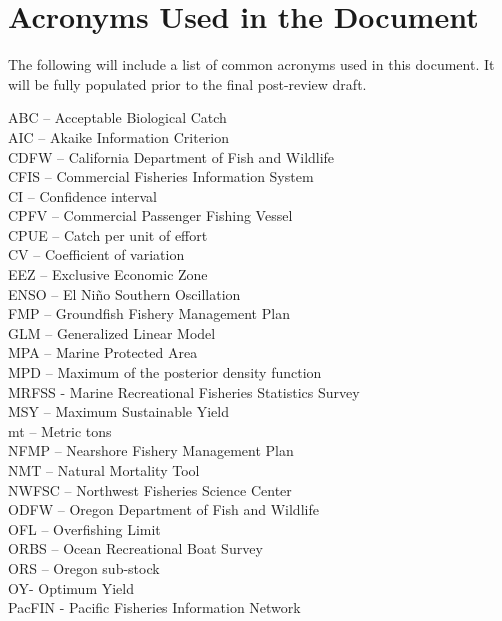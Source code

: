 \documentclass[11pt,
  english,
  letterpaper,
]{article}
\begin{document}
\newpage

\hypertarget{acronyms-used-in-the-document}{%
\section*{Acronyms Used in the Document}\label{acronyms-used-in-the-document}}

The following will include a list of common acronyms used in this document. It will be fully populated prior to the final post-review draft.

ABC -- Acceptable Biological Catch\\
AIC -- Akaike Information Criterion\\
CDFW -- California Department of Fish and Wildlife\\
CFIS -- Commercial Fisheries Information System\\
CI -- Confidence interval\\
CPFV -- Commercial Passenger Fishing Vessel\\
CPUE -- Catch per unit of effort\\
CV -- Coefficient of variation\\
EEZ -- Exclusive Economic Zone\\
ENSO -- El Niño Southern Oscillation\\
FMP -- Groundfish Fishery Management Plan\\
GLM -- Generalized Linear Model\\
MPA -- Marine Protected Area\\
MPD -- Maximum of the posterior density function\\
MRFSS - Marine Recreational Fisheries Statistics Survey\\
MSY -- Maximum Sustainable Yield\\
mt -- Metric tons\\
NFMP -- Nearshore Fishery Management Plan\\
NMT -- Natural Mortality Tool\\
NWFSC -- Northwest Fisheries Science Center\\
ODFW -- Oregon Department of Fish and Wildlife\\
OFL -- Overfishing Limit\\
ORBS -- Ocean Recreational Boat Survey\\
ORS -- Oregon sub-stock\\
OY- Optimum Yield\\
PacFIN - Pacific Fisheries Information Network\\
\end{document}
